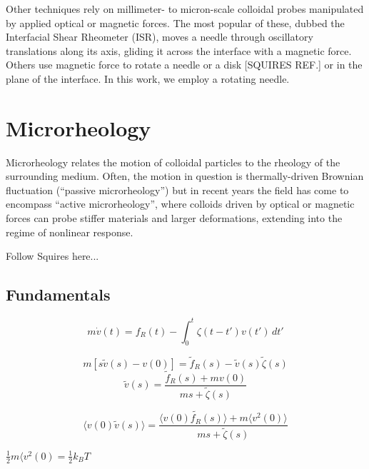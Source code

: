 Other techniques rely on millimeter- to micron-scale colloidal probes manipulated by applied optical or magnetic forces. The most popular of these, dubbed the Interfacial Shear Rheometer (ISR), moves a needle through oscillatory translations along its axis\cite{Brooks1999}, gliding it across the interface with a magnetic force. Others use magnetic force to rotate a needle\cite{Lee2010} or a disk [SQUIRES REF.] or in the plane of the interface. In this work, we employ a rotating needle.


\section{Microrheology}

Microrheology relates the motion of colloidal particles to the rheology of the surrounding medium. Often, the motion in question is thermally-driven Brownian fluctuation (``passive microrheology'') but in recent years the field has come to encompass ``active microrheology'', where colloids driven by optical or magnetic forces can probe stiffer materials and larger deformations, extending into the regime of nonlinear response.

Follow Squires here...

\subsection{Fundamentals}

\begin{equation}
  m\dot{v}(t) = f_R(t) - \int_0^t\zeta(t-t')v(t')\,dt'
\end{equation}

\begin{equation}
  m\left[s\tilde{v}(s) - v(0)\right] = \tilde{f}_R(s) - \tilde{v}(s)\tilde{\zeta}(s)
\end{equation}
\begin{equation}
  \tilde{v}(s) = \frac{\tilde{f}_R(s) + mv(0)}{ms + \tilde{\zeta}(s)}
\end{equation}

\begin{equation}
  \langle v(0)\tilde{v}(s) \rangle = \frac{\langle v(0)\tilde{f_R}(s)\rangle + m \langle v^2(0)\rangle}{ms + \tilde{\zeta}(s)}
\end{equation}

$\frac{1}{2}m\langle v^2(0) = \frac{1}{2}k_B T$


